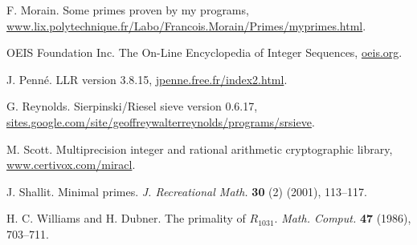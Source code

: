 \documentclass[12pt]{article}
\theoremstyle{plain}
\theoremstyle{definition}
\newcommand{\0}{\mathtt{0}}
\newcommand{\1}{\mathtt{1}}
\newcommand{\2}{\mathtt{2}}
\newcommand{\3}{\mathtt{3}}
\newcommand{\4}{\mathtt{4}}
\newcommand{\5}{\mathtt{5}}
\newcommand{\6}{\mathtt{6}}
\newcommand{\7}{\mathtt{7}}
\newcommand{\8}{\mathtt{8}}
\newcommand{\9}{\mathtt{9}}
\newcommand{\updated}[1]{{\color{red}#1}}
\renewcommand{\updated}[1]{#1}
\begin{document}
\begin{thebibliography}{10}
\updated{  F. Morain.
\newblock Some primes proven by my programs, \newline
\url{www.lix.polytechnique.fr/Labo/Francois.Morain/Primes/myprimes.html}.}

  OEIS Foundation Inc.
\newblock The On-Line Encyclopedia of Integer Sequences,
\url{oeis.org}.

  J. Penn\'e.
\newblock LLR version 3.8.15,
\url{jpenne.free.fr/index2.html}.

  G. Reynolds.
\newblock Sierpinski/Riesel sieve version 0.6.17, \newline
\url{sites.google.com/site/geoffreywalterreynolds/programs/srsieve}.

\updated{  M. Scott.
\newblock Multiprecision integer and rational arithmetic 
cryptographic library,
\url{www.certivox.com/miracl}.}

  J. Shallit.
\newblock Minimal primes.
\newblock \textit{J. Recreational Math.} {\bf 30} (2) (2001), 113--117.

  H. C. Williams and H. Dubner.
\newblock The primality of $R_{1031}$.
\newblock \textit{Math. Comput.} {\bf 47} (1986), 703--711.

\end{thebibliography}
\end{document}
